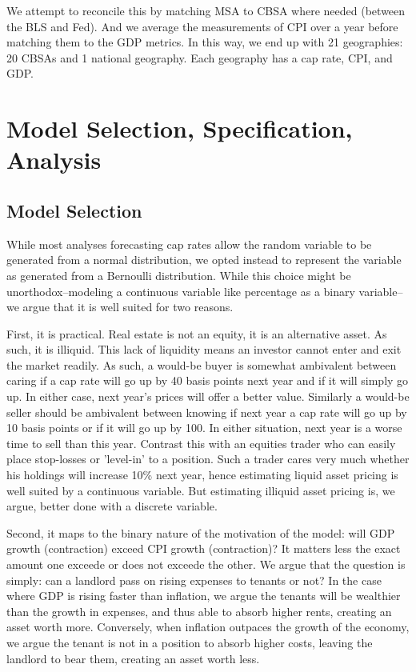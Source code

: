 We attempt to reconcile this by matching MSA to CBSA where needed (between the BLS and Fed). And we average the measurements of CPI over a year before matching them to the GDP metrics. In this way, we end up with 21 geographies: 20 CBSAs and 1 national geography. Each geography has a cap rate, CPI, and GDP. 
 
\section{Model Selection, Specification, Analysis}

\subsection{Model Selection}
While most analyses forecasting cap rates allow the random variable to be generated from a normal distribution, we opted instead to represent the variable as generated from a Bernoulli distribution. While this choice might be unorthodox--modeling a continuous variable like percentage as a binary variable-- we argue that it is well suited for two reasons. 

First, it is practical. Real estate is not an equity, it is an alternative asset. As such, it is illiquid. This lack of liquidity means an investor cannot enter and exit the market readily. As such, a would-be buyer is somewhat ambivalent between caring if a cap rate will go up by 40 basis points next year and if it  will simply go up. In either case, next year's prices will offer a better value. Similarly a would-be seller should be ambivalent between knowing if next year a cap rate will go up by 10 basis points or if it will go up by 100. In either situation, next year is a worse time to sell than this year.  Contrast this with an equities trader who can easily place stop-losses or 'level-in' to a position. Such a trader cares very much whether his holdings will increase 10\% next year, hence estimating liquid asset pricing is well suited by a continuous variable. But estimating illiquid asset pricing is, we argue, better done with a discrete variable. 

Second, it maps to the binary nature of the motivation of the model: will GDP growth (contraction) exceed CPI growth (contraction)? It matters less the exact amount one exceede or does not exceede the other. We argue that the question is simply: can a landlord pass on rising expenses to tenants or not? In the case where GDP is rising faster than inflation, we argue the tenants will be wealthier than the growth in expenses, and thus able to absorb higher rents, creating an asset worth more. Conversely, when inflation outpaces the growth of the economy, we argue the tenant is not in a position to absorb higher costs, leaving the landlord to bear them, creating an asset worth less. 

